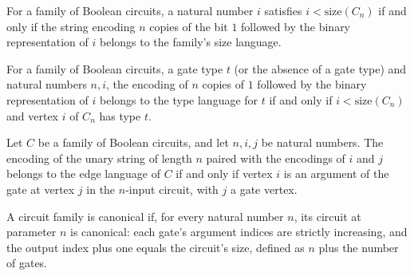 \begin{lemma}
\label{BoolCircuit.DAGCircuitFamily.mem_sizeLang}
\leanok
{}
For a family of Boolean circuits, a natural number $i$ satisfies $i<\mathrm{size}(C_n)$
if and only if the string encoding $n$ copies of the bit $1$ followed by the binary
representation of $i$ belongs to the family’s size language.
\end{lemma}

\begin{lemma}
\label{BoolCircuit.DAGCircuitFamily.mem_typeLang}
\leanok
{}
For a family of Boolean circuits, a gate type $t$ (or the absence of a gate type) and
natural numbers $n,i$, the encoding of $n$ copies of $1$ followed by the binary
representation of $i$ belongs to the type language for $t$ if and only if
$i<\mathrm{size}(C_n)$ and vertex $i$ of $C_n$ has type $t$.
\end{lemma}

\begin{lemma}
\label{BoolCircuit.DAGCircuitFamily.mem_edgeLang}
\leanok
{}
Let $C$ be a family of Boolean circuits, and let $n,i,j$ be natural numbers. The
encoding of the unary string of length $n$ paired with the encodings of $i$ and $j$
belongs to the edge language of $C$ if and only if vertex $i$ is an argument of the gate
at vertex $j$ in the $n$-input circuit, with $j$ a gate vertex.
\end{lemma}

\begin{definition}
\label{BoolCircuit.DAGCircuitFamily.IsCanonical}
\leanok
{}
A circuit family is canonical if, for every natural number $n$, its circuit at parameter
$n$ is canonical: each gate’s argument indices are strictly increasing, and the output
index plus one equals the circuit’s size, defined as $n$ plus the number of gates.
\end{definition}
